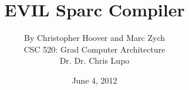 \documentclass[12pt]{article}
\begin{document}
\title{EVIL Sparc Compiler}

\author{
By Christopher Hoover and Marc Zych \vspace{10pt} \\
CSC 520: Grad Computer Architecture \vspace{10pt} \\
Dr.
Dr. Chris Lupo \vspace{10pt} \\
}
\date{June 4, 2012}

\maketitle

\vfill

\thispagestyle{empty}
\newpage

\tableofcontents
\newpage
\end{document}
